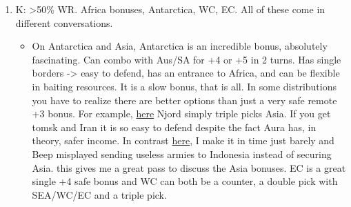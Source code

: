 \begin{enumerate}
    \begin{itemize}
        \item In SEA vs Scandinavia or SEA vs WR/CR boards, as the SEA player you have pathways from Iran and Caucasus into breaking those bonuses. Simple plan of build a stack -> kill. this extends to the overall downside that region of Scandi/WR/CR have in that they are easy to break. \href{https://www.warzone.com/MultiPlayer?GameID=40511685}{Here} Octane is down 8 Income but has a simple plan in getting in there and punching with a stack. So coming back to the SEA vs Scandi/WR/CR argument:
        \begin{enumerate}
            \item you build stack Iran->Georgia-> Break WR.
            \item they build stack Xinjiang -> Pakistan and Break SEA
        \end{enumerate}
        \item After the break, if you had SEA + Indonesia they are 4 turns away, if you had SEA + somewhere else on the map, they have a bunch of useless armies in Pakistan and will never eliminate you for the bonus is a straight line. Your stack is in a better position. For example \href{https://www.warzone.com/MultiPlayer?GameID=20536396}{here}, as much as Rufus broke SEA, it is impossible to move towards Indonesia. A couple of turns later, Rufus breaks Indonesia from Hawaii, but those armies are again misplaced and this gives just enough tempo for Njord to pivot. 
    \end{itemize}
    \item K: >50\% WR. Africa bonuses, Antarctica, WC, EC. All of these come in different conversations.
    \begin{itemize}
        \item On Antarctica and Asia, Antarctica is an incredible bonus, absolutely fascinating. Can combo with Aus/SA for +4 or +5 in 2 turns. Has single borders -> easy to defend, has an entrance to Africa, and can be flexible in baiting resources. It is a slow bonus, that is all. In some distributions you have to realize there are better options than just a very safe remote +3 bonus. For example, \href{https://www.warzone.com/MultiPlayer?GameID=21060202}{here} Njord simply triple picks Asia. If you get tomsk and Iran it is so easy to defend despite the fact Aura has, in theory, safer income. In contrast \href{https://www.warzone.com/MultiPlayer?GameID=40072623}{here}, I make it in time just barely and Beep misplayed sending useless armies to Indonesia instead of securing Asia. this gives me a great pass to discuss the Asia bonuses. EC is a great single +4 safe bonus and WC can both be a counter, a double pick with SEA/WC/EC and a triple pick. 

\end{itemize}
\end{enumerate}
